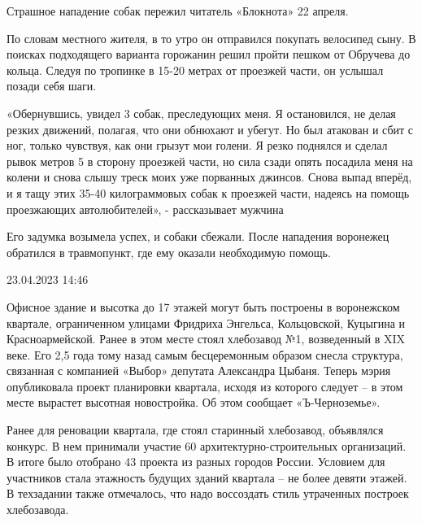 \documentclass{article}
\date{\today}
\begin{document}
\maketitle
\begin{multicols}{3}

\begin{window} 
Страшное нападение собак пережил читатель «Блокнота»  22 апреля. 

По словам местного жителя, в то утро он отправился покупать велосипед сыну. В поисках подходящего варианта горожанин решил пройти пешком от Обручева до кольца. Следуя по тропинке в 15-20 метрах от проезжей части, он услышал позади себя шаги. 

«Обернувшись, увидел 3 собак, преследующих меня. Я остановился, не делая резких движений, полагая, что они обнюхают и убегут. Но был атакован и сбит с ног, только чувствуя, как они грызут мои голени. Я резко поднялся и сделал рывок метров 5 в сторону проезжей части, но сила сзади опять посадила меня на колени и снова слышу треск моих  уже порванных джинсов. Снова выпад вперёд, и я тащу этих 35-40 килограммовых собак к проезжей части, надеясь на помощь проезжающих автолюбителей», - рассказывает мужчина 

Его задумка возымела успех, и собаки сбежали. После нападения воронежец обратился в травмопункт, где ему оказали необходимую помощь.

23.04.2023 14:46\end{window}
\closearticle
{}

\begin{window} 
Офисное здание и высотка до 17 этажей могут быть построены в воронежском квартале, ограниченном улицами Фридриха Энгельса, Кольцовской, Куцыгина и Красноармейской. Ранее в этом месте стоял хлебозавод №1, возведенный в XIX веке. Его 2,5 года тому назад самым бесцеремонным образом снесла структура, связанная с компанией «Выбор» депутата Александра Цыбаня. Теперь мэрия опубликовала проект планировки квартала, исходя из которого следует – в этом месте вырастет высотная новостройка. Об этом сообщает «Ъ-Черноземье».

Ранее для реновации квартала, где стоял старинный хлебозавод, объявлялся конкурс. В нем принимали участие 60 архитектурно-строительных организаций. В итоге было отобрано 43 проекта из разных городов России. Условием для участников стала этажность будущих зданий квартала – не более девяти этажей. В техзадании также отмечалось, что надо воссоздать стиль утраченных построек хлебозавода.


\end{window}
\end{multicols}
\end{document}
